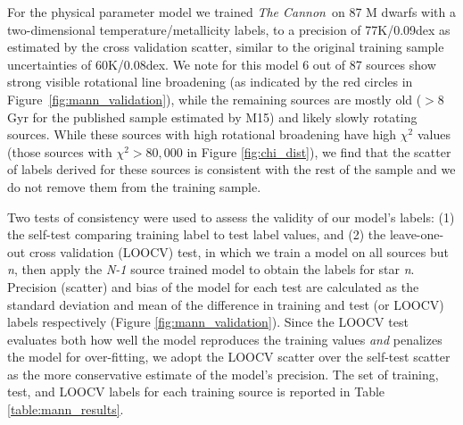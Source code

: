\documentclass[twocolumn]{aastex62}
\newcommand{\thecannon}{\textsl{The Cannon}}
\begin{document}
For the physical parameter model we trained \thecannon\ on 87 M dwarfs with a two-dimensional temperature/metallicity labels, to a precision of 77K/0.09dex as estimated by the cross validation scatter, similar to the original training sample uncertainties of 60K/0.08dex. We note for this model 6 out of 87 sources show strong visible rotational line broadening (as indicated by the red circles in Figure~\ref{fig:mann_validation}), while the remaining sources are mostly old ($>8$ Gyr for the published sample estimated by M15) and likely slowly rotating sources. While these sources with high rotational broadening have high $\chi^2$ values (those sources with $\chi^2 > 80,000$ in Figure \ref{fig:chi_dist}), we find that the scatter of labels derived for these sources is consistent with the rest of the sample and we do not remove them from the training sample.

Two tests of consistency were used to assess the validity of our model's labels: (1) the self-test comparing training label to test label values, and (2) the leave-one-out cross validation (LOOCV) test, in which we train a model on all sources but \emph{n}, then apply the \emph{N-1} source trained model to obtain the labels for star \emph{n}. Precision (scatter) and bias of the model for each test are calculated as the standard deviation and mean of the difference in training and test (or LOOCV) labels respectively (Figure \ref{fig:mann_validation}). Since the LOOCV test evaluates both how well the model reproduces the training values \emph{and} penalizes the model for over-fitting, we adopt the LOOCV scatter over the self-test scatter as the more conservative estimate of the model's precision. The set of training, test, and LOOCV labels for each training source is reported in Table \ref{table:mann_results}.
\end{document}
